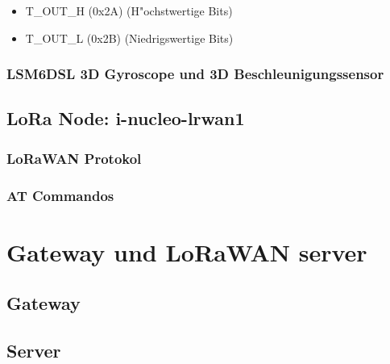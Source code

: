 \begin{itemize}
	\item T\_OUT\_H (0x2A) (H"ochstwertige Bits)
	\item T\_OUT\_L (0x2B) (Niedrigswertige Bits)
\end{itemize}



\subsection{LSM6DSL 3D Gyroscope und 3D Beschleunigungssensor}\label{Acc/Gy}


\section{LoRa Node: i-nucleo-lrwan1}\label{LoRa Modul}
\subsection{LoRaWAN Protokol}\label{LoRaWAN_P}
\subsection{AT Commandos}\label{AT}


\chapter{Gateway und LoRaWAN server}\label{G_S}

\section{Gateway}\label{Gateway}
\section{Server}\label{server}
